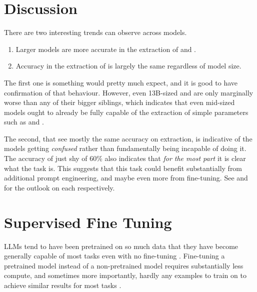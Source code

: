 \section{Discussion}\label{sec:discussion}
There are two interesting trends  can observe across models.

\begin{enumerate}
    \item Larger models are more accurate in the extraction of \ttemp and \ttime.
    \item Accuracy in the extraction of \tsolv is largely the same regardless of model size.
\end{enumerate}

The first one is something  would pretty much expect, and it is good to have confirmation of that behaviour.
However, even 13B-sized  and  are only marginally worse than any of their bigger siblings, which indicates that even mid-sized models ought to already be fully capable of the extraction of simple parameters such as \ttemp and \ttime.

The second, that  see mostly the same accuracy on \tsolv extraction, is indicative of the models getting \textit{confused} rather than fundamentally being incapable of doing it.
The accuracy of just shy of 60\% also indicates that \textit{for the most part} it is clear what the task is.
This suggests that this task could benefit substantially from additional prompt engineering, and maybe even more from fine-tuning. See  and  for the outlook on each respectively.





\section{Supervised Fine Tuning}\label{sec:sft}
\glspl{LLM} tend to have been pretrained on so much data that they have become generally capable of most tasks even with no fine-tuning \cite{brown_language_2020}.
Fine-tuning a pretrained model instead of a non-pretrained model requires substantially less compute, and sometimes more importantly, hardly any examples to train on to achieve similar results for most tasks \cite{gaddipati_comparative_2020}.

